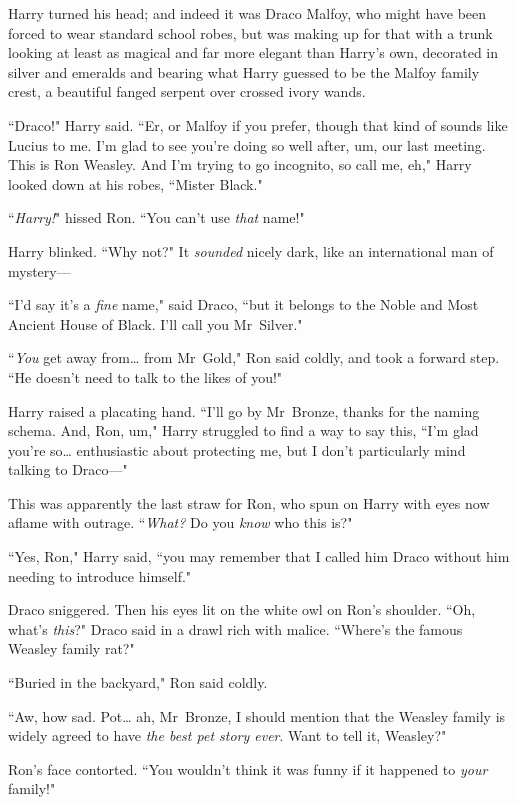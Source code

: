 Harry turned his head; and indeed it was Draco Malfoy, who might have been forced to wear standard school robes, but was making up for that with a trunk looking at least as magical and far more elegant than Harry's own, decorated in silver and emeralds and bearing what Harry guessed to be the Malfoy family crest, a beautiful fanged serpent over crossed ivory wands.

``Draco!" Harry said. ``Er, or Malfoy if you prefer, though that kind of sounds like Lucius to me. I'm glad to see you're doing so well after, um, our last meeting. This is Ron Weasley. And I'm trying to go incognito, so call me, eh," Harry looked down at his robes, ``Mister Black."

``\emph{Harry!}" hissed Ron. ``You can't use \emph{that} name!"

Harry blinked. ``Why not?" It \emph{sounded} nicely dark, like an international man of mystery—

``I'd say it's a \emph{fine} name," said Draco, ``but it belongs to the Noble and Most Ancient House of Black. I'll call you Mr~Silver."

``\emph{You} get away from{\ldots} from Mr~Gold," Ron said coldly, and took a forward step. ``He doesn't need to talk to the likes of you!"

Harry raised a placating hand. ``I'll go by Mr~Bronze, thanks for the naming schema. And, Ron, um," Harry struggled to find a way to say this, ``I'm glad you're so{\ldots} enthusiastic about protecting me, but I don't particularly mind talking to Draco—"

This was apparently the last straw for Ron, who spun on Harry with eyes now aflame with outrage. ``\emph{What?} Do you \emph{know} who this is?"

``Yes, Ron," Harry said, ``you may remember that I called him Draco without him needing to introduce himself."

Draco sniggered. Then his eyes lit on the white owl on Ron's shoulder. ``Oh, what's \emph{this}?" Draco said in a drawl rich with malice. ``Where's the famous Weasley family rat?"

``Buried in the backyard," Ron said coldly.

``Aw, how sad. Pot{\ldots} ah, Mr~Bronze, I should mention that the Weasley family is widely agreed to have \emph{the best pet story ever}. Want to tell it, Weasley?"

Ron's face contorted. ``You wouldn't think it was funny if it happened to \emph{your} family!"

